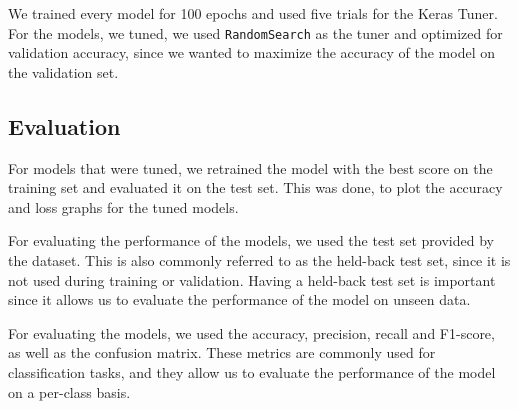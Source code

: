 We trained every model for 100 epochs and used five trials for the Keras Tuner.
For the models, we tuned, we used \texttt{RandomSearch} as the tuner and optimized for validation accuracy, since we wanted to maximize the accuracy of the model on the validation set.

\subsection{Evaluation}\label{subsec:evaluation}

For models that were tuned, we retrained the model with the best score on the training set and evaluated it on the test set.
This was done, to plot the accuracy and loss graphs for the tuned models.

For evaluating the performance of the models, we used the test set provided by the dataset.
This is also commonly referred to as the held-back test set, since it is not used during training or validation.
Having a held-back test set is important since it allows us to evaluate the performance of the model on unseen data.

For evaluating the models, we used the accuracy, precision, recall and F1-score, as well as the confusion matrix.
These metrics are commonly used for classification tasks, and they allow us to evaluate the performance of the model on a per-class basis.